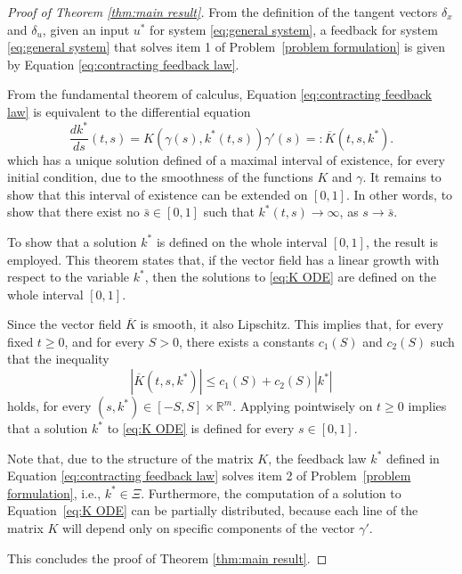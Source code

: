 \documentclass[10pt,twocolumn,twoside]{IEEEtran}
\theoremstyle{plain}
\theoremstyle{definition}
\theoremstyle{remark}
\begin{document}
\begin{proof}[Proof of Theorem \ref{thm:main result}]
	From the definition of the tangent vectors $\delta_x$ and $\delta_u$, given an input $u^\ast$ for system \eqref{eq:general system}, a feedback for system \eqref{eq:general system} that solves item 1 of Problem~\ref{problem formulation} is given by Equation \eqref{eq:contracting feedback law}. 
	
	From the fundamental theorem of calculus, Equation \eqref{eq:contracting feedback law} is equivalent to the differential equation
	\begin{equation}\label{eq:K ODE}
		\frac{dk^\ast}{ds}(t,s)=K(\gamma(s),k^\ast(t,s))\gamma'(s)=:\overline{K}(t,s,k^\ast).
	\end{equation}
	which has a unique solution defined of a maximal interval of existence, for every initial condition, due to the smoothness of the functions $K$ and $\gamma$. It remains to show that this interval of existence can be extended on $[0,1]$. In other words, to show that there exist no $\bar{s}\in[0,1]$ such that $k^\ast(t,s)\to\infty$, as $s\to\bar{s}$.
	
	To show that a solution $k^\ast$ is defined on the whole interval $[0,1]$, the result  \cite[Theorem 2.12]{Teschl2012} is employed. This theorem states that, if the vector field has a linear growth with respect to the variable $k^\ast$, then the solutions to \eqref{eq:K ODE} are defined on the whole interval $[0,1]$.
		
	Since the vector field $\overline{K}$ is smooth, it also Lipschitz. This implies that, for every fixed $t\geq0$, and for every $S>0$, there exists a constants $c_1(S)$ and $c_2(S)$ such that the inequality
	\begin{equation*}
		\left|\overline{K}(t,s,k^\ast)\right|\leq c_1(S)+c_2(S)|k^\ast|
	\end{equation*}
	holds, for every $(s,k^\ast)\in [-S,S]\times\mathbb{R}^m$. Applying \cite[Theorem 2.12]{Teschl2012} pointwisely on $t\geq0$ implies that a solution $k^\ast$ to \eqref{eq:K ODE} is defined for every $s\in[0,1]$.
	
	Note that, due to the structure of the matrix $K$, the feedback law $k^\ast$ defined in Equation \eqref{eq:contracting feedback law} solves item 2 of Problem~\ref{problem formulation}, i.e., $k^\ast\in\Xi$. Furthermore, the computation of a solution to Equation~\eqref{eq:K ODE} can be partially distributed, because each line of the matrix $K$ will depend only on specific components of the vector $\gamma'$.
	
	 This concludes the proof of Theorem \ref{thm:main result}.
\end{proof}
\end{document}

